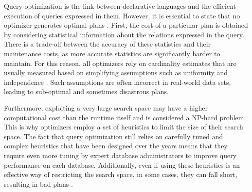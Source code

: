 Query optimization is the link between declarative languages and the efficient execution of queries expressed in them. However, it is essential to state that no optimizer generates optimal plans \citep{Bailis2015}. First, the cost of a particular plan is obtained by considering statistical information about the relations expressed in the query. There is a trade-off between the accuracy of these statistics and their maintenance costs, as more accurate statistics are significantly harder to maintain. For this reason, all optimizers rely on cardinality estimates that are usually measured based on simplifying assumptions such as uniformity and independence \citep{Leis2015}. Such assumptions are often incorrect in real-world data sets, leading to sub-optimal and sometimes disastrous plans.

Furthermore, exploiting a very large search space may have a higher computational cost than the runtime itself and is considered a NP-hard problem. This is why optimizers employ a set of heuristics to limit the size of their search space. The fact that query optimization still relies on carefully tuned and complex heuristics that have been designed over the years means that they require even more tuning by expert database administrators to improve query performance on each database. Additionally, even if using these heuristics is an effective way of restricting the search space, in some cases, they can fall short, resulting in bad plans \citep{Leis2015}.
